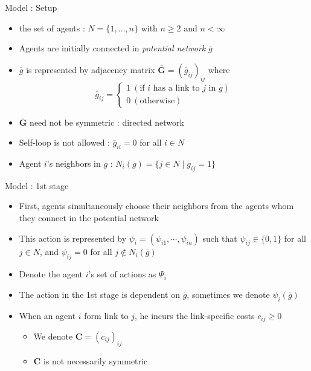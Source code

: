 \documentclass[10pt,dvipdfmx]{beamer}
\begin{document}
\begin{frame}{Model : Setup}
\begin{itemize}
    \item the set of agents : $N = \{ 1, \ldots, n \}$ with $n \ge 2$ and $n < \infty$
    \item Agents are initially connected in {\it{potential network}} $\overline{g}$
    \item $\overline{g}$ is represented by adjacency matrix $\bm{\overline{G}} = {(\overline{g}_{ij})}_{ij}$ where
    \[ \overline{g}_{ij} =
        \begin{cases}
            1 \  (\text{if $i$ has a link to $j$ in $\overline{g}$}) \\
            0 \  (\text{otherwise})
        \end{cases} \]
    \item $\bm{\overline{G}}$ need not be symmetric : directed network
    \item Self-loop is not allowed : $\overline{g}_{ii} = 0$ for all $i \in N$
    \item Agent $i$'s neighbors in $\overline{g}$ : $N_i(\overline{g}) = \{ j \in N \mid \overline{g}_{ij} = 1 \}$
\end{itemize}
\end{frame}

\begin{frame}{Model : 1st stage}
\begin{itemize}
    \item First, agents simultaneously choose their neighbors from the agents whom they connect in the potential network
    \item This action is represented by $\psi_i = (\psi_{i1}, \cdots, \psi_{in})$ such that $\psi_{ij} \in \{0, 1\}$ for all $j \in N$, and $\psi_{ij} = 0$ for all $j \notin N_i(\overline{g})$
    \item Denote the agent $i$'s set of actions as $\Psi_i$
    \item The action in the 1st stage is dependent on $\overline{g}$, sometimes we denote $\psi_i(\overline{g})$
    \item When an agent $i$ form link to $j$, he incurs the link-specific costs $c_{ij} \ge 0$
    \begin{itemize}
        \item We denote $\bm{C} = {(c_{ij})}_{ij}$
        \item $\bm{C}$ is not necessarily symmetric
    \end{itemize}
\end{itemize}
\end{frame}
\end{document}
